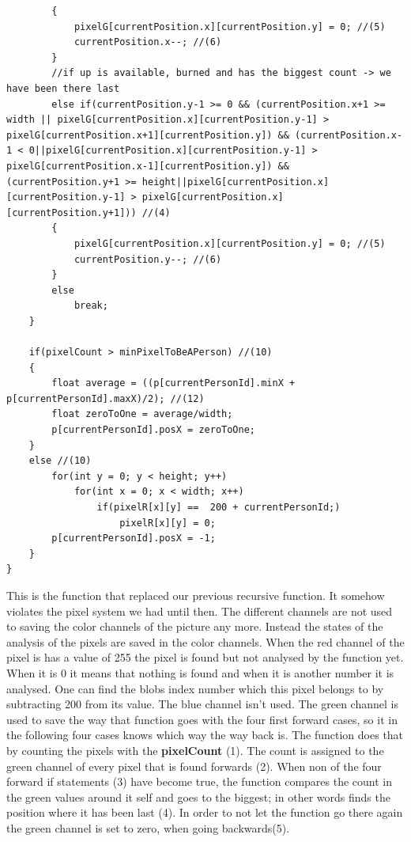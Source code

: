 \begin{lstlisting}
		{
			pixelG[currentPosition.x][currentPosition.y] = 0; //(5)
			currentPosition.x--; //(6)
		}
		//if up is available, burned and has the biggest count -> we have been there last
		else if(currentPosition.y-1 >= 0 && (currentPosition.x+1 >= width || pixelG[currentPosition.x][currentPosition.y-1] > pixelG[currentPosition.x+1][currentPosition.y]) && (currentPosition.x-1 < 0||pixelG[currentPosition.x][currentPosition.y-1] > pixelG[currentPosition.x-1][currentPosition.y]) && (currentPosition.y+1 >= height||pixelG[currentPosition.x][currentPosition.y-1] > pixelG[currentPosition.x][currentPosition.y+1])) //(4)
		{
			pixelG[currentPosition.x][currentPosition.y] = 0; //(5)
			currentPosition.y--; //(6)
		}
		else
			break;
	}
	
	if(pixelCount > minPixelToBeAPerson) //(10)
	{
		float average = ((p[currentPersonId].minX + p[currentPersonId].maxX)/2); //(12)
		float zeroToOne = average/width;
		p[currentPersonId].posX = zeroToOne;
	}
	else //(10)
		for(int y = 0; y < height; y++)
			for(int x = 0; x < width; x++)
				if(pixelR[x][y] ==  200 + currentPersonId;)
					pixelR[x][y] = 0;
		p[currentPersonId].posX = -1;
	}
}
\end{lstlisting}
This is the function that replaced our previous recursive function. It somehow violates the pixel system we had until then. The different channels are not used to saving the color channels of the picture any more. Instead the states of the analysis of the pixels are saved in the color channels. 
When the red channel of the pixel is has a value of 255 the pixel is found but not analysed by the function yet. When it is 0 it means that nothing is found and when it is another number it is analysed. One can find the blobs index number which this pixel belongs to by subtracting 200 from its value. The blue channel isn't used. The green channel is used to save the way that function goes with the four first forward cases, so it in the following four cases knows which way the way back is. The function does that by counting the pixels with the \textbf{pixelCount} (1). The count is assigned to the green channel of every pixel that is found forwards (2). When non of the four forward if statements (3) have become true, the function compares the count in the green values around it self and goes to the biggest; in other words finds the position where it has been last (4). In order to not let the function go there again the green channel is set to zero, when going backwards(5).
